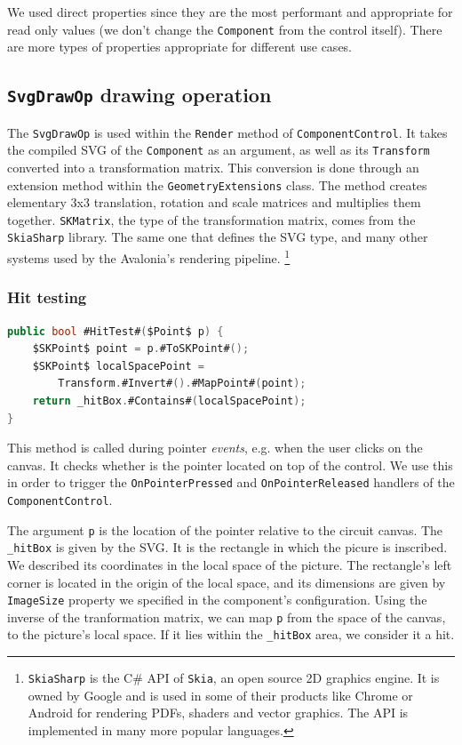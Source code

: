 We used direct properties since they are the most performant and appropriate for read only values (we don't change the \texttt{Component} from the control itself). There are more types of properties appropriate for different use cases. \cite{avalonia_properties}

\subsection{\texttt{SvgDrawOp} drawing operation}

The \texttt{SvgDrawOp} is used within the \texttt{Render} method of \texttt{ComponentControl}. It takes the compiled SVG of the \texttt{Component} as an argument, as well as its \texttt{Transform} converted into a transformation matrix. This conversion is done through an extension method within the \texttt{GeometryExtensions} class. The method creates elementary 3x3 translation, rotation and scale matrices and multiplies them together. \texttt{SKMatrix}, the type of the transformation matrix, comes from the \texttt{SkiaSharp} library. The same one that defines the SVG type, and many other systems used by the Avalonia's rendering pipeline.
\footnote{\texttt{SkiaSharp} is the C\# API of \texttt{Skia}, an open source 2D graphics engine. It is owned by Google and is used in some of their products like Chrome or Android for rendering PDFs, shaders and vector graphics. \cite{skia} The API is implemented in many more popular languages. }

\subsubsection{Hit testing}

\begin{lstlisting}[language=csharp, caption={\texttt{SvgDrawOp.HitTest} method}]
public bool #HitTest#($Point$ p) {
    $SKPoint$ point = p.#ToSKPoint#();
    $SKPoint$ localSpacePoint = 
        Transform.#Invert#().#MapPoint#(point);
    return _hitBox.#Contains#(localSpacePoint);
}
\end{lstlisting}

This method is called during pointer \textit{events}, e.g. when the user clicks on the canvas. It checks whether is the pointer located on top of the control. We use this in order to trigger the \texttt{OnPointerPressed} and \texttt{OnPointerReleased} handlers of the \texttt{ComponentControl}. 

The argument \texttt{p} is the location of the pointer relative to the circuit canvas. The \texttt{\_hitBox} is given by the SVG. It is the rectangle in which the picure is inscribed. We described its coordinates in the local space of the picture. The rectangle's left corner is located in the origin of the local space, and its dimensions are given by \texttt{ImageSize} property we specified in the component's configuration. Using the inverse of the tranformation matrix, we can map \texttt{p} from the space of the canvas, to the picture's local space. If it lies within the \texttt{\_hitBox} area, we consider it a hit.

